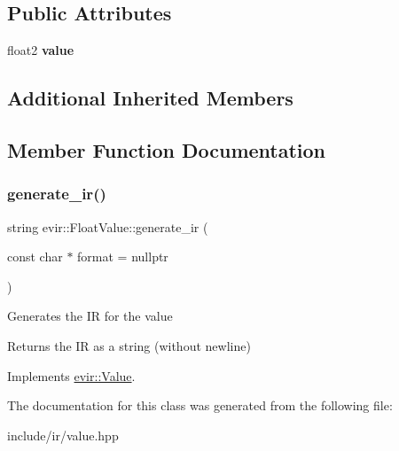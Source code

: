 \subsection*{Public Attributes}
\begin{DoxyCompactItemize}
\item 
\mbox{\label{classevir_1_1FloatValue_a15fa49462955f59082b7b1381c3867a7}} 
float2 {\bfseries value}
\end{DoxyCompactItemize}
\subsection*{Additional Inherited Members}


\subsection{Member Function Documentation}
\mbox{\label{classevir_1_1FloatValue_a775e25d41c34aca73ed9418963bb652b}} 
\subsubsection{\texorpdfstring{generate\+\_\+ir()}{generate\_ir()}}
{\footnotesize\ttfamily string evir\+::\+Float\+Value\+::generate\+\_\+ir (\begin{DoxyParamCaption}\item[{const char $\ast$}]{format = {\ttfamily nullptr} }\end{DoxyParamCaption})\hspace{0.3cm}{\ttfamily [virtual]}}

Generates the IR for the value \begin{DoxyReturn}{Returns}
the IR as a string (without newline) 
\end{DoxyReturn}


Implements \hyperlink{classevir_1_1Value_a3e7e5bc634fd5bba528324076fe2a763}{evir\+::\+Value}.



The documentation for this class was generated from the following file\+:\begin{DoxyCompactItemize}
\item 
include/ir/value.\+hpp\end{DoxyCompactItemize}

